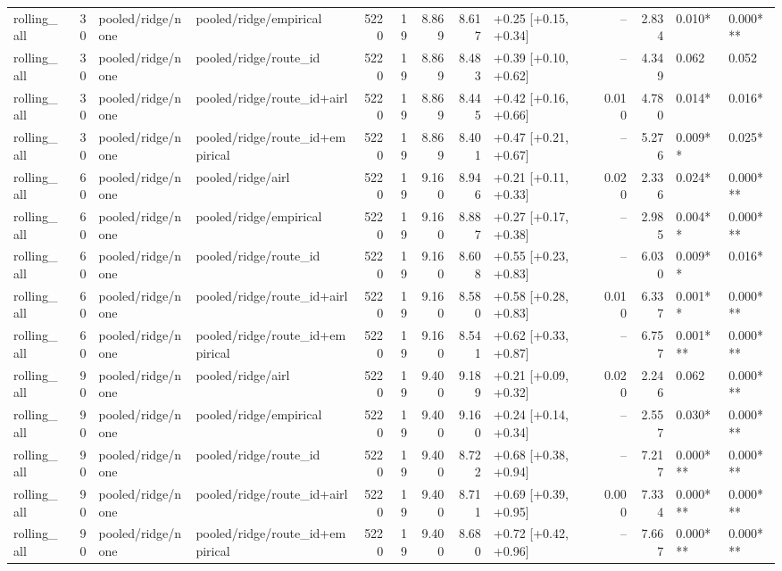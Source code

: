 \begin{tabular}{lrllrrrrlrrll}
rolling_all & 30 & pooled/ridge/none & pooled/ridge/empirical & 5220 & 19 & 8.869 & 8.617 & +0.25 [+0.15, +0.34] & -- & 2.834 & 0.010* & 0.000*** \\
rolling_all & 30 & pooled/ridge/none & pooled/ridge/route_id & 5220 & 19 & 8.869 & 8.483 & +0.39 [+0.10, +0.62] & -- & 4.349 & 0.062 & 0.052 \\
rolling_all & 30 & pooled/ridge/none & pooled/ridge/route_id+airl & 5220 & 19 & 8.869 & 8.445 & +0.42 [+0.16, +0.66] & 0.010 & 4.780 & 0.014* & 0.016* \\
rolling_all & 30 & pooled/ridge/none & pooled/ridge/route_id+empirical & 5220 & 19 & 8.869 & 8.401 & +0.47 [+0.21, +0.67] & -- & 5.276 & 0.009** & 0.025* \\
rolling_all & 60 & pooled/ridge/none & pooled/ridge/airl & 5220 & 19 & 9.160 & 8.946 & +0.21 [+0.11, +0.33] & 0.020 & 2.336 & 0.024* & 0.000*** \\
rolling_all & 60 & pooled/ridge/none & pooled/ridge/empirical & 5220 & 19 & 9.160 & 8.887 & +0.27 [+0.17, +0.38] & -- & 2.985 & 0.004** & 0.000*** \\
rolling_all & 60 & pooled/ridge/none & pooled/ridge/route_id & 5220 & 19 & 9.160 & 8.608 & +0.55 [+0.23, +0.83] & -- & 6.030 & 0.009** & 0.016* \\
rolling_all & 60 & pooled/ridge/none & pooled/ridge/route_id+airl & 5220 & 19 & 9.160 & 8.580 & +0.58 [+0.28, +0.83] & 0.010 & 6.337 & 0.001** & 0.000*** \\
rolling_all & 60 & pooled/ridge/none & pooled/ridge/route_id+empirical & 5220 & 19 & 9.160 & 8.541 & +0.62 [+0.33, +0.87] & -- & 6.757 & 0.001*** & 0.000*** \\
rolling_all & 90 & pooled/ridge/none & pooled/ridge/airl & 5220 & 19 & 9.400 & 9.189 & +0.21 [+0.09, +0.32] & 0.020 & 2.246 & 0.062 & 0.000*** \\
rolling_all & 90 & pooled/ridge/none & pooled/ridge/empirical & 5220 & 19 & 9.400 & 9.160 & +0.24 [+0.14, +0.34] & -- & 2.557 & 0.030* & 0.000*** \\
rolling_all & 90 & pooled/ridge/none & pooled/ridge/route_id & 5220 & 19 & 9.400 & 8.722 & +0.68 [+0.38, +0.94] & -- & 7.217 & 0.000*** & 0.000*** \\
rolling_all & 90 & pooled/ridge/none & pooled/ridge/route_id+airl & 5220 & 19 & 9.400 & 8.711 & +0.69 [+0.39, +0.95] & 0.000 & 7.334 & 0.000*** & 0.000*** \\
rolling_all & 90 & pooled/ridge/none & pooled/ridge/route_id+empirical & 5220 & 19 & 9.400 & 8.680 & +0.72 [+0.42, +0.96] & -- & 7.667 & 0.000*** & 0.000*** \\

\end{tabular}
